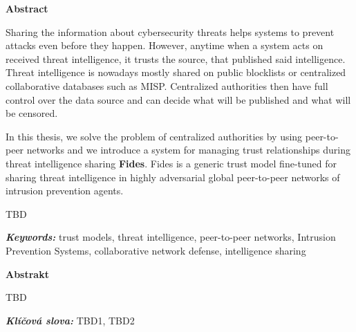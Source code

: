 \newenvironment{abstractpage}
  {\cleardoublepage\thispagestyle{empty}}
  {\vfill\cleardoublepage}
\newenvironment{abstract}[1]
  {\bigskip
   \begin{center}\bfseries#1\end{center}\small\leftskip=0.5cm\rightskip=0.5cm}
  {\par\bigskip}

\providecommand{\keywords}[2]{\footnotesize\textbf{\textit{#1:}} #2}

\begin{abstractpage}
\begin{abstract}{Abstract}
Sharing the information about cybersecurity threats helps systems to prevent attacks even before they happen.
However, anytime when a system acts on received threat intelligence, it trusts the source, that published said intelligence.
Threat intelligence is nowadays mostly shared on public blocklists or centralized collaborative databases such as MISP.
Centralized authorities then have full control over the data source and can decide what will be published and what will be censored.

In this thesis, we solve the problem of centralized authorities by using peer-to-peer networks and we introduce a system for managing trust relationships during threat intelligence sharing \textbf{Fides}.
Fides is a generic trust model fine-tuned for sharing threat intelligence in highly adversarial global peer-to-peer networks of intrusion prevention agents.

TBD 
\end{abstract}

\keywords{Keywords}{trust models, threat intelligence, peer-to-peer networks, Intrusion Prevention Systems, collaborative network defense, intelligence sharing}

\vspace*{\fill}

\begin{abstract}{Abstrakt}
    TBD 
    
\end{abstract}
\keywords{Klíčová slova}{TBD1, TBD2} 

\end{abstractpage}
\thispagestyle{empty}

\cleardoublepage